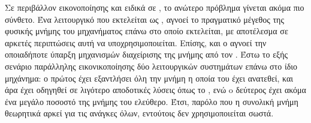 Σε περιβάλλον εικονοποίησης και ειδικά σε ,
το ανώτερο πρόβλημα γίνεται ακόμα πιο σύνθετο. Ένα λειτουργικό
που εκτελείται ως , αγνοεί το πραγματικό μέγεθος της φυσικής
μνήμης του μηχανήματος επάνω στο οποίο εκτελείται, με αποτέλεσμα
σε αρκετές περιπτώσεις αυτή να υποχρησιμοποιείται. Επίσης, και ο
 αγνοεί την οποιαδήποτε ύπαρξη μηχανισμών διαχείρισης της
μνήμης από τον \cite{paperAimiliou}. Έστω το εξής σενάριο παράλληλης εικονικοποίησης
δύο  λειτουργικών συστημάτων επάνω στο ίδιο μηχάνημα: ο πρώτος
 έχει εξαντλήσει όλη την μνήμη η οποία του έχει ανατεθεί, και
άρα έχει οδηγηθεί σε λιγότερο αποδοτικές λύσεις όπως το ,
ενώ o δεύτερος έχει ακόμα ένα μεγάλο ποσοστό της μνήμης του
ελεύθερο. Έτσι, παρόλο που η συνολική μνήμη θεωρητικά αρκεί για
τις ανάγκες όλων, εντούτοις δεν χρησιμοποιείται σωστά.
\newline

